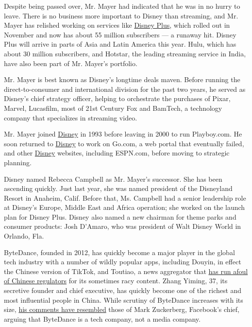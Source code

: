 Despite being passed over, Mr. Mayer had indicated that he was in no
hurry to leave. There is no business more important to Disney than
streaming, and Mr. Mayer has relished working on services like
\href{https://www.nytimes.com/2019/04/11/business/media/disney-plus-streaming.html?searchResultPosition=8}{Disney
Plus}, which rolled out in November and now has about 55 million
subscribers --- a runaway hit. Disney Plus will arrive in parts of Asia
and Latin America this year. Hulu, which has about 30 million
subscribers, and Hotstar, the leading streaming service in India, have
also been part of Mr. Mayer's portfolio.

Mr. Mayer is best known as Disney's longtime deals maven. Before running
the direct-to-consumer and international division for the past two
years, he served as Disney's chief strategy officer, helping to
orchestrate the purchases of Pixar, Marvel, Lucasfilm, most of 21st
Century Fox and BamTech, a technology company that specializes in
streaming video.

Mr. Mayer joined \href{javascript:void(0);}{Disney} in 1993 before
leaving in 2000 to run Playboy.com. He soon returned to
\href{javascript:void(0);}{Disney} to work on Go.com, a web portal that
eventually failed, and other \href{javascript:void(0);}{Disney}
websites, including ESPN.com, before moving to strategic planning.

Disney named Rebecca Campbell as Mr. Mayer's successor. She has been
ascending quickly. Just last year, she was named president of the
Disneyland Resort in Anaheim, Calif. Before that, Ms. Campbell had a
senior leadership role at Disney's Europe, Middle East and Africa
operation; she worked on the launch plan for Disney Plus. Disney also
named a new chairman for theme parks and consumer products: Josh
D'Amaro, who was president of Walt Disney World in Orlando, Fla.

ByteDance, founded in 2012, has quickly become a major player in the
global tech industry with a number of wildly popular apps, including
Douyin, in effect the Chinese version of TikTok, and Toutiao, a news
aggregator that
\href{https://www.nytimes.com/2018/01/02/business/china-toutiao-censorship.html}{has
run afoul of Chinese regulators} for its sometimes racy content. Zhang
Yiming, 37, its secretive founder and chief executive, has quickly
become one of the richest and most influential people in China. While
scrutiny of ByteDance increases with its size,
\href{https://www.nytimes.com/2019/11/05/business/tiktok-china-bytedance.html}{his
comments have resembled} those of Mark Zuckerberg, Facebook's chief,
arguing that ByteDance is a tech company, not a media company.

